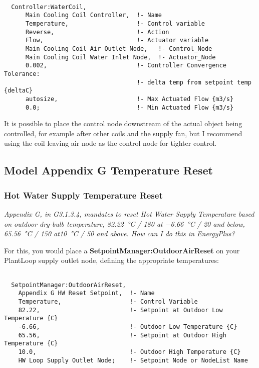 \begin{lstlisting}

  Controller:WaterCoil,
      Main Cooling Coil Controller,  !- Name
      Temperature,                   !- Control variable
      Reverse,                       !- Action
      Flow,                          !- Actuator variable
      Main Cooling Coil Air Outlet Node,   !- Control_Node
      Main Cooling Coil Water Inlet Node,  !- Actuator_Node
      0.002,                         !- Controller Convergence Tolerance:
                                     !- delta temp from setpoint temp {deltaC}
      autosize,                      !- Max Actuated Flow {m3/s}
      0.0;                           !- Min Actuated Flow {m3/s}
\end{lstlisting}

It is possible to place the control node downstream of the actual object being controlled, for example after other coils and the supply fan, but I recommend using the coil leaving air node as the control node for tighter control.



\subsection{Model Appendix G Temperature Reset}%
\label{sub:model_appendix_g_temperature_reset}

\subsubsection{Hot Water Supply Temperature Reset}%
\label{ssub:hot_water_supply_temperature_reset}

\emph{Appendix G, in G3.1.3.4, mandates to reset Hot Water Supply Temperature based on outdoor dry-bulb temperature, \SI{82.22}{\celsius} / \SI{180}{\fahrenheit} at \SI{-6.66}{\celsius} / \SI{20}{\fahrenheit} and below, \SI{65.56}{\celsius} / \SI{150}{\fahrenheit} at\SI{10}{\celsius} / \SI{50}{\fahrenheit} and above. How can I do this in EnergyPlus?}

For this, you would place a \textbf{SetpointManager:OutdoorAirReset} on your PlantLoop supply outlet node, defining the appropriate temperatures:

\begin{lstlisting}

  SetpointManager:OutdoorAirReset,
    Appendix G HW Reset Setpoint,  !- Name
    Temperature,                   !- Control Variable
    82.22,                         !- Setpoint at Outdoor Low Temperature {C}
    -6.66,                         !- Outdoor Low Temperature {C}
    65.56,                         !- Setpoint at Outdoor High Temperature {C}
    10.0,                          !- Outdoor High Temperature {C}
    HW Loop Supply Outlet Node;    !- Setpoint Node or NodeList Name

\end{lstlisting}



